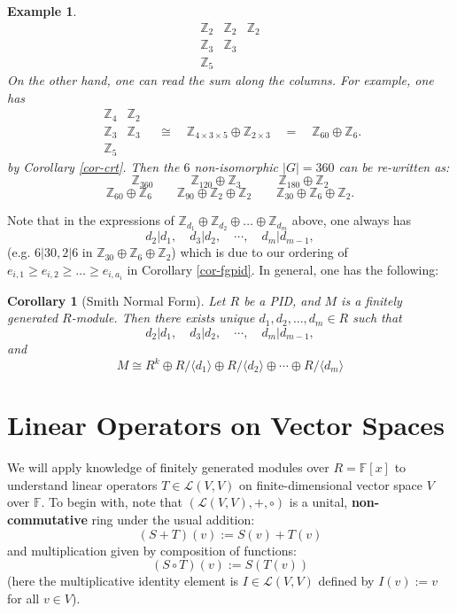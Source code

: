 \documentclass[12pt]{amsbook}
\newtheorem{corollary}[theorem]{Corollary}
\newtheorem{example}[theorem]{Example}
\begin{document}
\begin{example}
$$    \begin{matrix}
        \mathbb{Z}_2 & \mathbb{Z}_2 & \mathbb{Z}_2\\
        \mathbb{Z}_3 & \mathbb{Z}_3 \\
        \mathbb{Z}_5 &
    \end{matrix}$$
On the other hand, one can read the sum along the columns. For example, one has 
$$\begin{matrix}
        \mathbb{Z}_4 & \mathbb{Z}_2 \\
        \mathbb{Z}_3 & \mathbb{Z}_3 \\
        \mathbb{Z}_5
    \end{matrix} \quad \cong \quad \mathbb{Z}_{4 \times 3 \times 5} \oplus \mathbb{Z}_{2 \times 3} \quad = \quad \mathbb{Z}_{60} \oplus \mathbb{Z}_6.$$
by Corollary \ref{cor-crt}. Then the $6$ non-isomorphic $|G| = 360$ can be re-written as:
$$\mathbb{Z}_{360} \quad \quad \quad \mathbb{Z}_{120} \oplus \mathbb{Z}_3 \quad \quad \quad  \mathbb{Z}_{180} \oplus \mathbb{Z}_2$$
$$\mathbb{Z}_{60} \oplus \mathbb{Z}_6 \quad \quad \mathbb{Z}_{90} \oplus \mathbb{Z}_2 \oplus \mathbb{Z}_2 \quad \quad \mathbb{Z}_{30} \oplus \mathbb{Z}_6 \oplus \mathbb{Z}_2.$$
\end{example}

Note that in the expressions of $\mathbb{Z}_{d_1} \oplus \mathbb{Z}_{d_2} \oplus \dots \oplus \mathbb{Z}_{d_m}$ above, one always has
$$d_2| d_1, \quad d_3 | d_2, \quad \cdots, \quad d_m|d_{m-1},$$
(e.g. $6|30, 2|6$ in $\mathbb{Z}_{30} \oplus \mathbb{Z}_6 \oplus \mathbb{Z}_2$) which is due to our ordering of $e_{i,1} \geq e_{i,2} \geq \dots \geq e_{i,a_i}$ in Corollary \ref{cor-fgpid}. In general, one has the following:
\begin{corollary}[Smith Normal Form]
Let $R$ be a PID, and $M$ is a finitely generated $R$-module. Then there exists unique $d_1, d_2, \dots, d_m \in R$ such that
$$d_2| d_1, \quad d_3 | d_2, \quad \cdots, \quad d_m|d_{m-1},$$
and 
$$M \cong R^k \oplus R/\langle d_1 \rangle \oplus
R/\langle d_2 \rangle \oplus \cdots \oplus R/\langle d_m \rangle$$
\end{corollary}



\chapter{Linear Operators on Vector Spaces}
We will apply knowledge of finitely generated modules over $R 
= \mathbb{F}[x]$ to understand linear operators $T \in \mathcal{L}(V,V)$ on finite-dimensional vector space $V$ over $\mathbb{F}$. To begin with, note that $(\mathcal{L}(V,V), +, \circ)$ is a unital, {\bf non-commutative} ring under the usual addition:
$$(S + T)(v) := S(v) + T(v)$$
and multiplication given by composition of functions:
$$(S \circ T)(v) := S(T(v))$$
(here the multiplicative identity element is $I \in \mathcal{L}(V,V)$ defined by $I(v) := v$ for all $v \in V$). 
\end{document}
